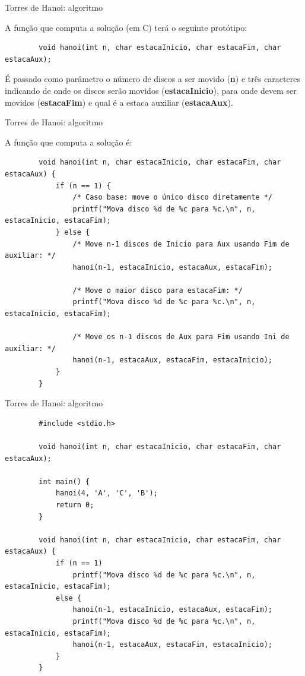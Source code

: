\documentclass[handout]{beamer}
\begin{document}
\begin{frame}[fragile]{Torres de Hanoi: algoritmo}

    A função que computa a solução (em C) terá o seguinte protótipo:

    \begin{verbatim}
        void hanoi(int n, char estacaInicio, char estacaFim, char estacaAux);
    \end{verbatim}

    É passado como parâmetro o número de discos a ser movido ({\bf n}) e três caracteres indicando de onde os discos serão movidos ({\bf estacaInicio}), para onde devem ser movidos ({\bf estacaFim}) e qual é a estaca auxiliar ({\bf estacaAux}).
\end{frame}

\begin{frame}[fragile]{Torres de Hanoi: algoritmo}

    A função que computa a solução é:

    \begin{verbatim}
        void hanoi(int n, char estacaInicio, char estacaFim, char estacaAux) {
            if (n == 1) {
                /* Caso base: move o único disco diretamente */
                printf("Mova disco %d de %c para %c.\n", n, estacaInicio, estacaFim);
            } else {
                /* Move n-1 discos de Inicio para Aux usando Fim de auxiliar: */
                hanoi(n-1, estacaInicio, estacaAux, estacaFim);

                /* Move o maior disco para estacaFim: */
                printf("Mova disco %d de %c para %c.\n", n, estacaInicio, estacaFim);

                /* Move os n-1 discos de Aux para Fim usando Ini de auxiliar: */
                hanoi(n-1, estacaAux, estacaFim, estacaInicio);
            }
        }
    \end{verbatim}
\end{frame}

\begin{frame}[fragile]{Torres de Hanoi: algoritmo}

    \begin{verbatim}
        #include <stdio.h>

        void hanoi(int n, char estacaInicio, char estacaFim, char estacaAux);

        int main() {
            hanoi(4, 'A', 'C', 'B');
            return 0;
        }

        void hanoi(int n, char estacaInicio, char estacaFim, char estacaAux) {
            if (n == 1)
                printf("Mova disco %d de %c para %c.\n", n, estacaInicio, estacaFim);
            else {
                hanoi(n-1, estacaInicio, estacaAux, estacaFim);
                printf("Mova disco %d de %c para %c.\n", n, estacaInicio, estacaFim);
                hanoi(n-1, estacaAux, estacaFim, estacaInicio);
            }
        }
    \end{verbatim}
\end{frame}
\end{document}
